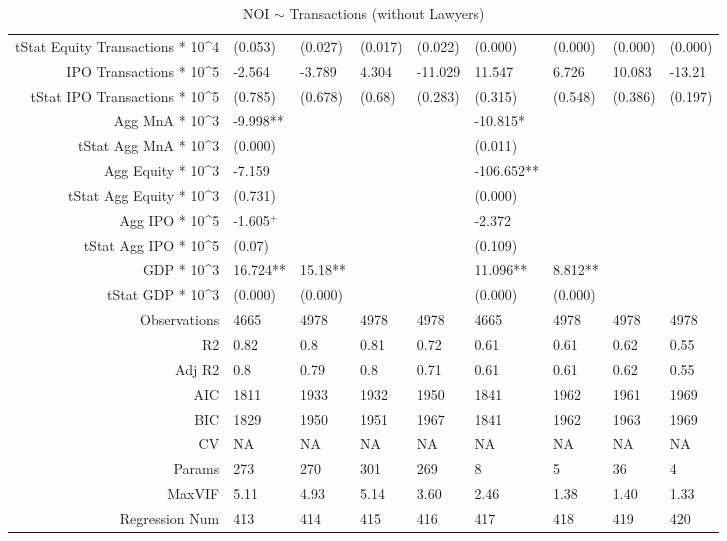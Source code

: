 \begin{table}[ht]
\begin{tabular}{rllllllll}
  tStat Equity Transactions * 10^4 & (0.053) & (0.027) & (0.017) & (0.022) & (0.000) & (0.000) & (0.000) & (0.000) \\ 
  IPO Transactions * 10^5 & -2.564 & -3.789 & 4.304 & -11.029 & 11.547 & 6.726 & 10.083 & -13.21 \\ 
  tStat IPO Transactions * 10^5 & (0.785) & (0.678) & (0.68) & (0.283) & (0.315) & (0.548) & (0.386) & (0.197) \\ 
  Agg MnA * 10^3 & -9.998** &  &  &  & -10.815* &  &  &  \\ 
  tStat Agg MnA * 10^3 & (0.000) &  &  &  & (0.011) &  &  &  \\ 
  Agg Equity * 10^3 & -7.159 &  &  &  & -106.652** &  &  &  \\ 
  tStat Agg Equity * 10^3 & (0.731) &  &  &  & (0.000) &  &  &  \\ 
  Agg IPO * 10^5 & -1.605$^{+}$ &  &  &  & -2.372 &  &  &  \\ 
  tStat Agg IPO * 10^5 & (0.07) &  &  &  & (0.109) &  &  &  \\ 
  GDP * 10^3 & 16.724** & 15.18** &  &  & 11.096** & 8.812** &  &  \\ 
  tStat GDP * 10^3 & (0.000) & (0.000) &  &  & (0.000) & (0.000) &  &  \\ 
  Observations & 4665 & 4978 & 4978 & 4978 & 4665 & 4978 & 4978 & 4978 \\ 
  R2 & 0.82 & 0.8 & 0.81 & 0.72 & 0.61 & 0.61 & 0.62 & 0.55 \\ 
  Adj R2 & 0.8 & 0.79 & 0.8 & 0.71 & 0.61 & 0.61 & 0.62 & 0.55 \\ 
  AIC & 1811 & 1933 & 1932 & 1950 & 1841 & 1962 & 1961 & 1969 \\ 
  BIC & 1829 & 1950 & 1951 & 1967 & 1841 & 1962 & 1963 & 1969 \\ 
  CV & NA & NA & NA & NA & NA & NA & NA & NA \\ 
  Params & 273 & 270 & 301 & 269 & 8 & 5 & 36 & 4 \\ 
  MaxVIF & 5.11 & 4.93 & 5.14 & 3.60 & 2.46 & 1.38 & 1.40 & 1.33 \\ 
  Regression Num & 413 & 414 & 415 & 416 & 417 & 418 & 419 & 420 \\ 
   \hline
\end{tabular}
\caption{NOI $\sim$ Transactions (without Lawyers)} 
\end{table}
